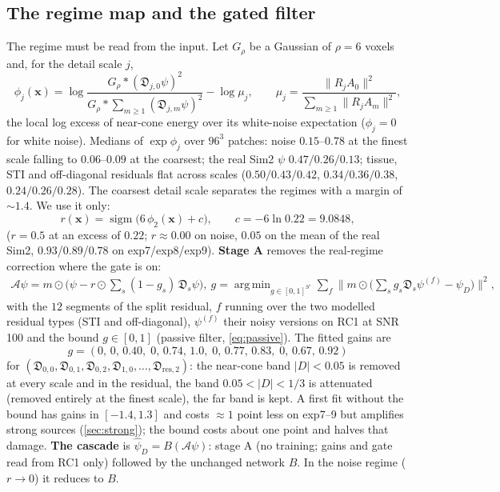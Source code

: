 \documentclass[11pt]{article}
\newcommand{\bx}{\bm{x}}
\newcommand{\md}{\mathfrak{D}}
\newcommand{\norm}[1]{\lVert #1\rVert}
\newcommand{\abs}[1]{\lvert #1\rvert}
\DeclareMathOperator{\argmin}{arg\,min}
\DeclareMathOperator{\sigm}{sigm}
\begin{document}
\subsection{The regime map and the gated filter}\label{sec:gate}
The regime must be read from the input. Let $G_\rho$ be a Gaussian of $\rho=6$ voxels and, for the detail scale $j$,
\begin{equation}\label{eq:excess}
\phi_j(\bx)=\log\frac{G_\rho\!*\!(\md_{j,0}\psi)^2}{G_\rho\!*\!\sum_{m\ge1}(\md_{j,m}\psi)^2}-\log\mu_j,\qquad \mu_j=\frac{\norm{R_jA_0}^2}{\sum_{m\ge1}\norm{R_jA_m}^2},
\end{equation}
the local log excess of near-cone energy over its white-noise expectation ($\phi_j=0$ for white noise). Medians of $\exp\phi_j$ over $96^3$ patches: noise $0.15$--$0.78$ at the finest scale falling to $0.06$--$0.09$ at the coarsest; the real Sim2 $\psi$ $0.47/0.26/0.13$; tissue, STI and off-diagonal residuals flat across scales ($0.50/0.43/0.42$, $0.34/0.36/0.38$, $0.24/0.26/0.28$). The coarsest detail scale separates the regimes with a margin of $\sim1.4$. We use it only:
\begin{equation}\label{eq:gate}
r(\bx)=\sigm\!\big(6\,\phi_{2}(\bx)+c\big),\qquad c=-6\ln0.22=9.0848,
\end{equation}
($r=0.5$ at an excess of $0.22$; $r\approx0.00$ on noise, $0.05$ on the mean of the real Sim2, $0.93$/$0.89$/$0.78$ on exp7/exp8/exp9). \textbf{Stage A} removes the real-regime correction where the gate is on:
\begin{gather}\label{eq:stageA}
\mathcal A\psi=m\odot\Big(\psi-r\odot\sum_{s}(1-g_s)\,\md_s\psi\Big),\
g=\argmin_{g\in[0,1]^{S'}}\sum_{f}\Big\lVert m\odot\Big(\sum_sg_s\md_s\psi^{(f)}-\psi_D\Big)\Big\rVert^2,
\end{gather}
with the $12$ segments of the split residual, $f$ running over the two modelled residual types (STI and off-diagonal), $\psi^{(f)}$ their noisy versions on RC1 at SNR\,100 and the bound $g\in[0,1]$ (passive filter, \cref{eq:passive}). The fitted gains are
\begin{equation}
g=(0,\,0,\,0.40,\;0,\,0.74,\,1.0,\;0,\,0.77,\,0.83,\;0,\,0.67,\,0.92)
\end{equation}
for $(\md_{0,0},\md_{0,1},\md_{0,2},\md_{1,0},\dots,\md_{\mathrm{res},2})$: the near-cone band $\abs D<0.05$ is removed at every scale and in the residual, the band $0.05<\abs D<1/3$ is attenuated (removed entirely at the finest scale), the far band is kept. A first fit without the bound has gains in $[-1.4,1.3]$ and costs $\approx1$ point less on exp7--9 but amplifies strong sources (\cref{sec:strong}); the bound costs about one point and halves that damage.
\textbf{The cascade} is $\widehat\psi_D=B(\mathcal A\psi)$: stage A (no training; gains and gate read from RC1 only) followed by the unchanged network $B$. In the noise regime ($r\to0$) it reduces to $B$.
\end{document}
